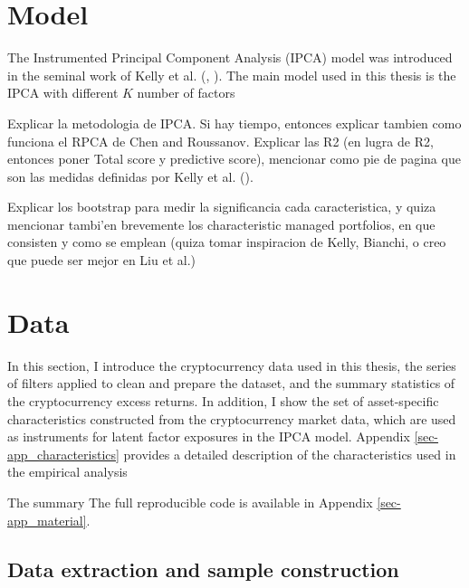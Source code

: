 \documentclass[
  12pt,
  a4paper,
  openany]{scrbook}
\begin{document}

\chapter{Model}\label{model}

The Instrumented Principal Component Analysis (IPCA) model was
introduced in the seminal work of Kelly et al.
(,
). The main model
used in this thesis is the IPCA with different \(K\) number of factors

Explicar la metodologia de IPCA. Si hay tiempo, entonces explicar
tambien como funciona el RPCA de Chen and Roussanov. Explicar las R2 (en
lugra de R2, entonces poner Total score y predictive score), mencionar
como pie de pagina que son las medidas definidas por Kelly et al.
().

Explicar los bootstrap para medir la significancia cada caracteristica,
y quiza mencionar tambi'en brevemente los characteristic managed
portfolios, en que consisten y como se emplean (quiza tomar inspiracion
de Kelly, Bianchi, o creo que puede ser mejor en Liu et al.)


\chapter{Data}\label{data}

In this section, I introduce the cryptocurrency data used in this
thesis, the series of filters applied to clean and prepare the dataset,
and the summary statistics of the cryptocurrency excess returns. In
addition, I show the set of asset-specific characteristics constructed
from the cryptocurrency market data, which are used as instruments for
latent factor exposures in the IPCA model. Appendix
\ref{sec-app_characteristics} provides a detailed description of the
characteristics used in the empirical analysis

The summary The full reproducible code is available in Appendix
\ref{sec-app_material}.

\section{Data extraction and sample
construction}\label{data-extraction-and-sample-construction}
\end{document}
